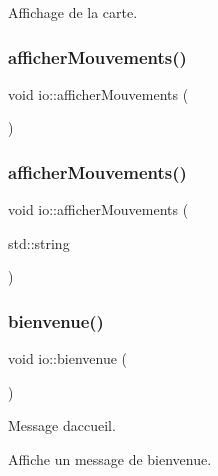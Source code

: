 Affichage de la carte. 

\mbox{\label{namespaceio_ac60b7c3503eb53e69a2adc86368ab633}} 
\subsubsection{\texorpdfstring{afficher\+Mouvements()}{afficherMouvements()}\hspace{0.1cm}{\footnotesize\ttfamily [1/2]}}
{\footnotesize\ttfamily void io\+::afficher\+Mouvements (\begin{DoxyParamCaption}{ }\end{DoxyParamCaption})}

\mbox{\label{namespaceio_a04bc641243df7c2655cda6b93dee199e}} 
\subsubsection{\texorpdfstring{afficher\+Mouvements()}{afficherMouvements()}\hspace{0.1cm}{\footnotesize\ttfamily [2/2]}}
{\footnotesize\ttfamily void io\+::afficher\+Mouvements (\begin{DoxyParamCaption}\item[{std\+::string}]{ }\end{DoxyParamCaption})}

\mbox{\label{namespaceio_a7fdf85a0d766d2dcdb9870ae0458826a}} 
\subsubsection{\texorpdfstring{bienvenue()}{bienvenue()}}
{\footnotesize\ttfamily void io\+::bienvenue (\begin{DoxyParamCaption}{ }\end{DoxyParamCaption})}



Message d\textquotesingle{}accueil. 

Affiche un message de bienvenue. \mbox{\label{namespaceio_ac0223d0ecfee82d8cc86543604173b73}} 
